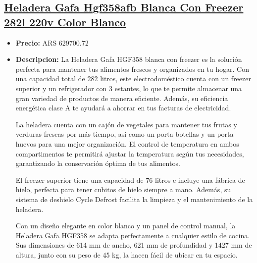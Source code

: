 \documentclass{article}
\begin{document}
    
    \begin{adjustwidth}{2em}{}

    \subsection{\underline{\href{https://www.mercadolibre.com.ar/heladera-gafa-hgf358afb-blanca-con-freezer-282l-220v-color-blanco/p/MLA19710493}{Heladera Gafa Hgf358afb Blanca Con Freezer 282l 220v Color Blanco}}}
    \begin{itemize}
        \item \textbf{Precio:} ARS 629700.72
        \item \textbf{Descripcion:} La Heladera Gafa HGF358 blanca con freezer es la solución perfecta para mantener tus alimentos frescos y organizados en tu hogar. Con una capacidad total de 282 litros, este electrodoméstico cuenta con un freezer superior y un refrigerador con 3 estantes, lo que te permite almacenar una gran variedad de productos de manera eficiente. Además, su eficiencia energética clase A te ayudará a ahorrar en tus facturas de electricidad.

La heladera cuenta con un cajón de vegetales para mantener tus frutas y verduras frescas por más tiempo, así como un porta botellas y un porta huevos para una mejor organización. El control de temperatura en ambos compartimentos te permitirá ajustar la temperatura según tus necesidades, garantizando la conservación óptima de tus alimentos.

El freezer superior tiene una capacidad de 76 litros e incluye una fábrica de hielo, perfecta para tener cubitos de hielo siempre a mano. Además, su sistema de deshielo Cycle Defrost facilita la limpieza y el mantenimiento de la heladera.

Con un diseño elegante en color blanco y un panel de control manual, la Heladera Gafa HGF358 se adapta perfectamente a cualquier estilo de cocina. Sus dimensiones de 614 mm de ancho, 621 mm de profundidad y 1427 mm de altura, junto con su peso de 45 kg, la hacen fácil de ubicar en tu espacio.


\end{itemize}
\end{adjustwidth}
\end{document}
